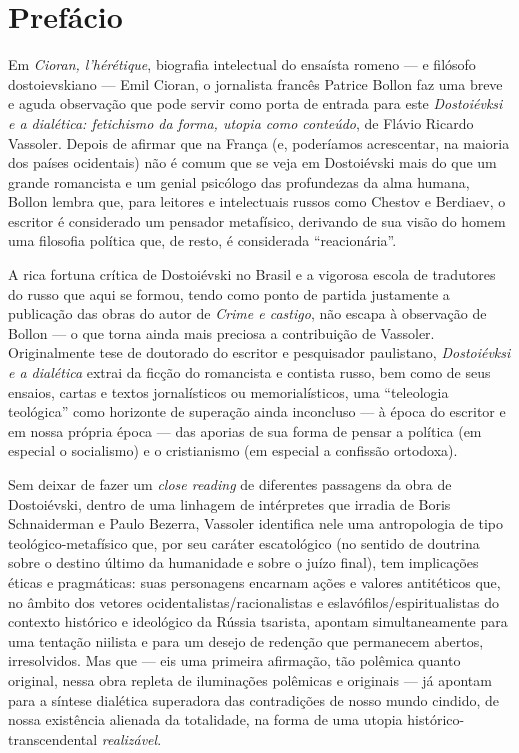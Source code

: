 \chapter*{Prefácio}



Em \emph{Cioran, l'hérétique}, biografia intelectual do ensaísta romeno
--- e filósofo dostoievskiano --- Emil Cioran, o jornalista francês
Patrice Bollon faz uma breve e aguda observação que pode servir como
porta de entrada para este \emph{Dostoiévksi e a dialética: fetichismo
da forma, utopia como conteúdo}, de Flávio Ricardo Vassoler. Depois de
afirmar que na França (e, poderíamos acrescentar, na maioria dos países
ocidentais) não é comum que se veja em Dostoiévski mais do que um grande
romancista e um genial psicólogo das profundezas da alma humana, Bollon
lembra que, para leitores e intelectuais russos como Chestov e Berdiaev,
o escritor é considerado um pensador metafísico, derivando de sua visão
do homem uma filosofia política que, de resto, é considerada
``reacionária''.

A rica fortuna crítica de Dostoiévski no Brasil e a vigorosa escola de
tradutores do russo que aqui se formou, tendo como ponto de partida
justamente a publicação das obras do autor de \emph{Crime e castigo},
não escapa à observação de Bollon --- o que torna ainda mais preciosa a
contribuição de Vassoler. Originalmente tese de doutorado do escritor e
pesquisador paulistano, \emph{Dostoiévksi e a dialética} extrai da
ficção do romancista e contista russo, bem como de seus ensaios, cartas
e textos jornalísticos ou memorialísticos, uma ``teleologia teológica''
como horizonte de superação ainda inconcluso --- à época do escritor e em
nossa própria época --- das aporias de sua forma de pensar a política (em
especial o socialismo) e o cristianismo (em especial a confissão
ortodoxa).

Sem deixar de fazer um \emph{close reading} de diferentes passagens da
obra de Dostoiévski, dentro de uma linhagem de intérpretes que irradia
de Boris Schnaiderman e Paulo Bezerra, Vassoler identifica nele uma
antropologia de tipo teológico-metafísico que, por seu caráter
escatológico (no sentido de doutrina sobre o destino último da
humanidade e sobre o juízo final), tem implicações éticas e pragmáticas:
suas personagens encarnam ações e valores antitéticos que, no âmbito dos
vetores ocidentalistas/racionalistas e eslavófilos/espiritualistas do
contexto histórico e ideológico da Rússia tsarista, apontam
simultaneamente para uma tentação niilista e para um desejo de redenção
que permanecem abertos, irresolvidos. Mas que --- eis uma primeira
afirmação, tão polêmica quanto original, nessa obra repleta de
iluminações polêmicas e originais --- já apontam para a síntese dialética
superadora das contradições de nosso mundo cindido, de nossa existência
alienada da totalidade, na forma de uma utopia histórico-transcendental
\emph{realizável}.

